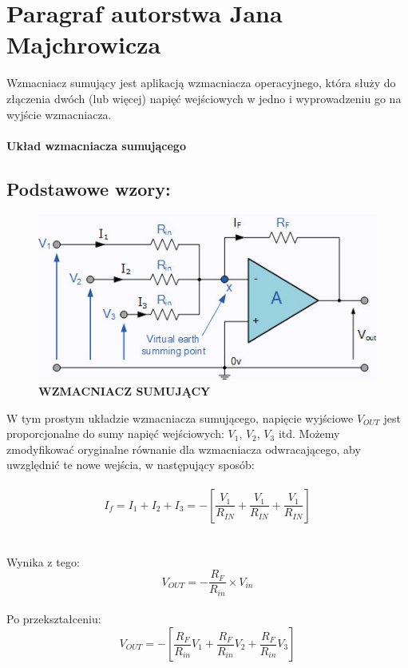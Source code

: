 \section{Paragraf autorstwa Jana Majchrowicza}
Wzmacniacz sumujący jest aplikacją wzmacniacza operacyjnego, która służy do złączenia dwóch (lub więcej) napięć wejściowych w jedno i wyprowadzeniu go na wyjście wzmacniacza.
\\
\\
    \LARGE{\textbf{Układ wzmacniacza sumującego}}
\subsection{Podstawowe wzory:}
        \begin{figure}[htbp]
            \centering
            \includegraphics[width=1\textwidth]{pictures/wzmacniacz1.jpg}
            \caption{\textbf {WZMACNIACZ SUMUJĄCY}}
            \label{fig:wzmacniacz}
        \end{figure}
\large{W tym prostym układzie wzmacniacza sumującego, napięcie wyjściowe $V_{OUT}$ jest proporcjonalne do sumy napięć wejściowych: $V_{1}$, $V_{2}$, $V_{3}$ itd. Możemy zmodyfikować oryginalne równanie dla wzmacniacza odwracającego, aby uwzględnić te nowe wejścia, w następujący sposób:}
\\
\\
    \begin{equation} \label{eq:1}
        I_{f}=I_{1}+I_{2}+I_{3}=-\left[\frac{V_{1}}{R_{IN}}+\frac{V_{1}}{R_{IN}}+\frac{V_{1}}{R_{IN}}\right]
    \end{equation}
    \\
    \\
Wynika z tego:
    \begin{equation} \label{eq:1}
        V_{OUT}=-\frac{R_{F}}{R_{in}} \times V_{in}
    \end{equation}
\\
Po przekształceniu:
    \begin{equation} \label{eq:1}
        V_{OUT}=-\left[\frac{R_{F}}{R_{in}}V_{1} + \frac{R_{F}}{R_{in}}V_{2}+\frac{R_{F}}{R_{in}}V_{3}\right]
    \end{equation}
    
